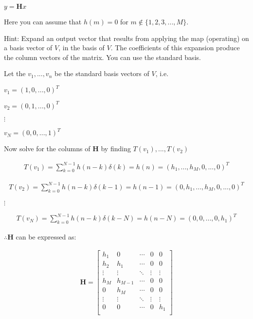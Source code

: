 \documentclass[fleqn]{article}
\newcommand{\zerodisplayskip}{
	\setlength{\abovedisplayskip}{0pt}
	\setlength{\belowdisplayskip}{0pt}
	\setlength{\abovedisplayshortskip}{0pt}
	\setlength{\belowdisplayshortskip}{0pt}
	\setlength{\mathindent}{0pt}}
\begin{document}
\begin{enumerate}[nolistsep]
\begin{enumerate}
			\begin{center}
				$y = \mathbf{H}x$
			\end{center}
			
			Here you can assume that $h(m) = 0$ for $m \not\in \{1,2,3,...,M\}$.
			
			Hint: Expand an output vector that results from applying the map (operating) on a basis vector of $V$, in the basis of $V$. The coefficients of this expansion produce the column vectors of the matrix. You can use the standard basis.

			Let the $v_1,...,v_n$ be the standard basis vectors of $V$, i.e.
			
			$v_1 = (1, 0,...,0)^T$
			
			$v_2 = (0, 1,...,0)^T$
			
			$\vdots$
			
			$v_N = (0, 0,...,1)^T$
			
			Now solve for the columns of $\mathbf{H}$ by finding $T(v_1),...,T(v_2)$
			
			\begin{align*}
				T(v_1) = \sum_{k=0}^{N-1}{h(n-k)\delta(k)} = h(n) = (h_1,...,h_M,0,...,0)^T
			\end{align*}
			
			\begin{align*}
				T(v_2) = \sum_{k=0}^{N-1}{h(n-k)\delta(k-1)} = h(n-1) = (0, h_1,...,h_M,0,...,0)^T
			\end{align*}
			
			$\vdots$
			
			\begin{align*}
				T(v_N) = \sum_{k=0}^{N-1}{h(n-k)\delta(k-N)} = h(n-N) = (0, 0,...,0,h_1)^T
			\end{align*}
			
			\newpage
			$\therefore \mathbf{H}$ can be expressed as:
			
			\singlespacing
			\begin{align*}
				\mathbf{H} =
				\begin{bmatrix}
					h_1 		& 0 			& \cdots 	& 0 			& 0\\
					h_2 		& h_1 		& \cdots 	& 0 			& 0\\
					\vdots 	& \vdots 	& \ddots 	& \vdots 	& \vdots\\
					h_M 		& h_{M-1} 	& \cdots 	& 0 			& 0\\
					0 		& h_M		& \cdots 	& 0 			& 0\\
					\vdots 	& \vdots 	& \ddots 	& \vdots 	& \vdots\\
					0 		& 0			& \cdots 	& 0 			& h_1\\
				\end{bmatrix}
			\end{align*}
			\zerodisplayskip
			\doublespacing
		\end{enumerate}
	\end{enumerate}
\end{document}
